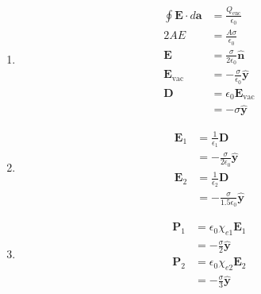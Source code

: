 \documentclass{article}
\renewcommand{\vec}[1]{\boldsymbol{\mathbf{#1}}}
\newcommand{\uvec}[1]{\hat{\vec{#1}}}
\begin{document}
\setcounter{subsection}{17}
\subsection{}

\begin{enumerate}
  \item

        \begin{align*}
          \oint \vec{E} \cdot d \vec{a} & = \frac{Q_\text{enc}}{\epsilon_0}      \\
          2 A E                         & = \frac{A \sigma}{\epsilon_0}          \\
          \vec{E}                       & = \frac{\sigma}{2 \epsilon_0} \uvec{n} \\
          \vec{E}_\text{vac}            & = -\frac{\sigma}{\epsilon_0} \uvec{y}  \\
          \vec{D}                       & = \epsilon_0 \vec{E}_\text{vac}        \\
                                        & = -\sigma \uvec{y}
        \end{align*}

  \item

        \begin{align*}
          \vec{E}_1 & = \frac{1}{\epsilon_1} \vec{D}            \\
                    & = -\frac{\sigma}{2 \epsilon_0} \uvec{y}   \\
          \vec{E}_2 & = \frac{1}{\epsilon_2} \vec{D}            \\
                    & = -\frac{\sigma}{1.5 \epsilon_0} \uvec{y}
        \end{align*}

  \item

        \begin{align*}
          \vec{P}_1 & = \epsilon_0 \chi_{e 1} \vec{E}_1 \\
                    & = -\frac{\sigma}{2} \uvec{y}      \\
          \vec{P}_2 & = \epsilon_0 \chi_{e 2} \vec{E}_2 \\
                    & = -\frac{\sigma}{3} \uvec{y}
        \end{align*}


\end{enumerate}
\end{document}
